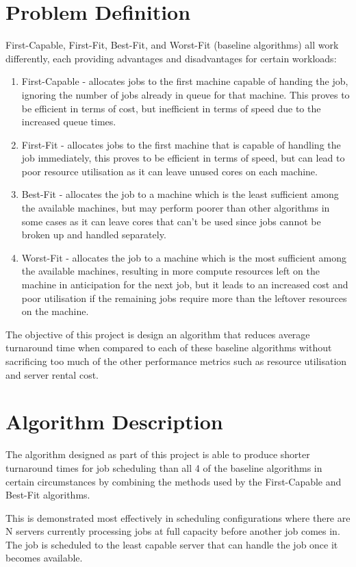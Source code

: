\documentclass[a4paper]{article}
\begin{document}
\section{Problem Definition}
\label{sec:section2}
First-Capable, First-Fit, Best-Fit, and Worst-Fit (baseline algorithms) all work differently, each providing advantages and disadvantages for certain workloads:
\begin{enumerate}
  \item First-Capable - allocates jobs to the first machine capable of handing the job, ignoring the number of jobs already in queue for that machine. This proves to be efficient in terms of cost, but inefficient in terms of speed due to the increased queue times.
  \item First-Fit - allocates jobs to the first machine that is capable of handling the job immediately, this proves to be efficient in terms of speed, but can lead to poor resource utilisation as it can leave unused cores on each machine. 
  \item Best-Fit - allocates the job to a machine which is the least sufficient among the available machines, but may perform poorer than other algorithms in some cases as it can leave cores that can't be used since jobs cannot be broken up and handled separately.
  \item Worst-Fit - allocates the job to a machine which is the most sufficient among the available machines, resulting in more compute resources left on the machine in anticipation for the next job, but it leads to an increased cost and poor utilisation if the remaining jobs require more than the leftover resources on the machine.
\end{enumerate}

The objective of this project is design an algorithm that reduces average turnaround time when compared to each of these baseline algorithms without sacrificing too much of the other performance metrics such as resource utilisation and server rental cost.

\section{Algorithm Description}
\label{sec:section3}
The algorithm designed as part of this project is able to produce shorter turnaround times for job scheduling than all 4 of the baseline algorithms in certain circumstances by combining the methods used by the First-Capable and Best-Fit algorithms.

This is demonstrated most effectively in scheduling configurations where there are N servers currently processing jobs at full capacity before another job comes in. The job is scheduled to the least capable server that can handle the job once it becomes available.
\end{document}
